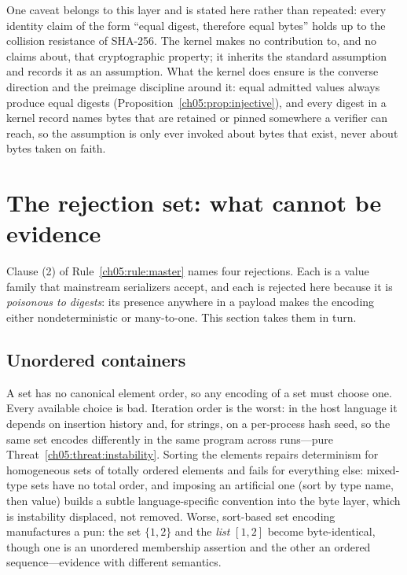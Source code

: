 One caveat belongs to this layer and is stated here rather than
repeated: every identity claim of the form ``equal digest, therefore
equal bytes'' holds up to the collision resistance of SHA-256. The
kernel makes no contribution to, and no claims about, that
cryptographic property; it inherits the standard assumption and records
it as an assumption. What the kernel does ensure is the converse
direction and the preimage discipline around it: equal admitted values
always produce equal digests (Proposition~\ref{ch05:prop:injective}),
and every digest in a kernel record names bytes that are retained or
pinned somewhere a verifier can reach, so the assumption is only ever
invoked about bytes that exist, never about bytes taken on faith.

\section{The rejection set: what cannot be evidence}\label{ch05:rejections}

Clause (2) of Rule~\ref{ch05:rule:master} names four rejections. Each is a
value family that mainstream serializers accept, and each is rejected here
because it is \emph{poisonous to digests}: its presence anywhere in a payload
makes the encoding either nondeterministic or many-to-one. This section
takes them in turn.

\subsection{Unordered containers}\label{ch05:sets}

A set has no canonical element order, so any encoding of a set must choose
one. Every available choice is bad. Iteration order is the worst: in the
host language it depends on insertion history and, for strings, on a
per-process hash seed, so the same set encodes differently in the same
program across runs---pure Threat~\ref{ch05:threat:instability}. Sorting the
elements repairs determinism for homogeneous sets of totally ordered
elements and fails for everything else: mixed-type sets have no total order,
and imposing an artificial one (sort by type name, then value) builds a
subtle language-specific convention into the byte layer, which is
instability displaced, not removed. Worse, sort-based set encoding
manufactures a pun: the set $\{1, 2\}$ and the \emph{list} $[1, 2]$ become
byte-identical, though one is an unordered membership assertion and the
other an ordered sequence---evidence with different semantics.

